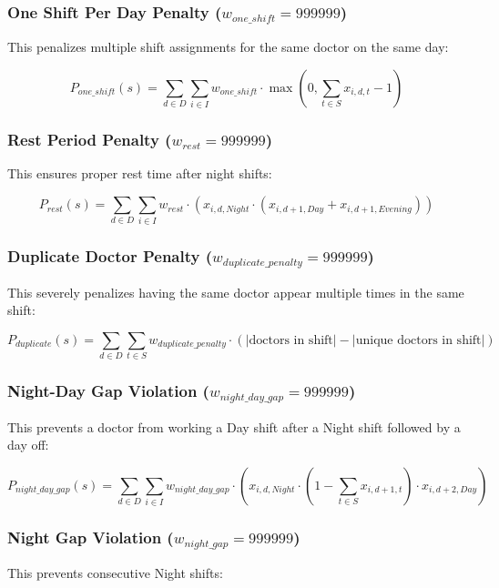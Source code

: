 \documentclass[12pt]{article}
\begin{document}
\subsubsection{One Shift Per Day Penalty ($w_{one\_shift} = 999999$)}
This penalizes multiple shift assignments for the same doctor on the same day:

\begin{equation}
P_{one\_shift}(s) = \sum_{d \in D} \sum_{i \in I} w_{one\_shift} \cdot \max\left(0, \sum_{t \in S} x_{i,d,t} - 1\right)
\end{equation}

\subsubsection{Rest Period Penalty ($w_{rest} = 999999$)}
This ensures proper rest time after night shifts:

\begin{equation}
P_{rest}(s) = \sum_{d \in D} \sum_{i \in I} w_{rest} \cdot (x_{i,d,Night} \cdot (x_{i,d+1,Day} + x_{i,d+1,Evening}))
\end{equation}

\subsubsection{Duplicate Doctor Penalty ($w_{duplicate\_penalty} = 999999$)}
This severely penalizes having the same doctor appear multiple times in the same shift:

\begin{equation}
P_{duplicate}(s) = \sum_{d \in D} \sum_{t \in S} w_{duplicate\_penalty} \cdot (|\text{doctors in shift}| - |\text{unique doctors in shift}|)
\end{equation}

\subsubsection{Night-Day Gap Violation ($w_{night\_day\_gap} = 999999$)}
This prevents a doctor from working a Day shift after a Night shift followed by a day off:

\begin{equation}
P_{night\_day\_gap}(s) = \sum_{d \in D} \sum_{i \in I} w_{night\_day\_gap} \cdot (x_{i,d,Night} \cdot (1-\sum_{t \in S}x_{i,d+1,t}) \cdot x_{i,d+2,Day})
\end{equation}

\subsubsection{Night Gap Violation ($w_{night\_gap} = 999999$)}
This prevents consecutive Night shifts:
\end{document}
